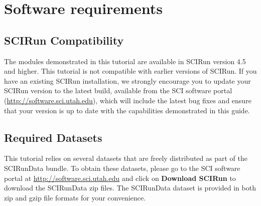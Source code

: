 \newpage

\section{Software requirements}

\subsection{SCIRun Compatibility}

The modules demonstrated in this tutorial are available in SCIRun
version 4.5 and higher. This tutorial is not compatible with earlier
 versions of SCIRun. If you have an existing SCIRun installation, we
 strongly encourage you to update your SCIRun version
to the latest build, available from the SCI software portal
(\href{http://software.sci.utah.edu}{http://software.sci.utah.edu}), which will include the latest bug
fixes and ensure that your version is up to date with the capabilities demonstrated in this guide.

\subsection{Required Datasets}

This tutorial relies on several datasets that are freely distributed as part of the
SCIRunData bundle. To obtain these datasets, please go to the SCI
software portal at \newline\href{http://software.sci.utah.edu}{http://software.sci.utah.edu} and click on {\bf
Download SCIRun} to download the SCIRunData zip files. The SCIRunData
dataset is provided in both zip and gzip file formats for your convenience.

